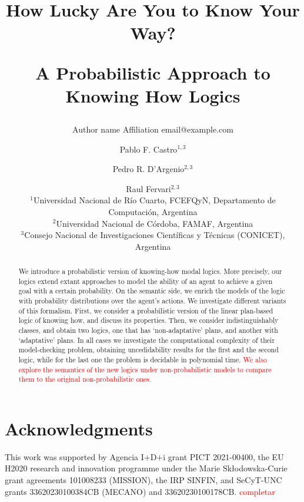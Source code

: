 \documentclass{article}
\title{How Lucky Are You to Know Your Way?\par A Probabilistic Approach to Knowing How Logics}   %
\author{%
    Author name
    \affiliations
    Affiliation
    \emails
    email@example.com    %
}
\author{%
Pablo F. Castro$^{1,3}$\and
Pedro R. D'Argenio$^{2,3}$\and
Raul Fervari$^{2,3}$ \\
\affiliations
$^1$Universidad Nacional de R\'io Cuarto, FCEFQyN, Departamento de Computaci\'on, Argentina\\
$^2$Universidad Nacional de C\'ordoba, FAMAF, Argentina\\
$^3$Consejo Nacional de Investigaciones Cient\'ificas y T\'ecnicas (CONICET), Argentina\\
}
\begin{document}
\maketitle

\begin{abstract}
  We introduce a probabilistic version of knowing-how modal logics.  More precisely,  our logics extend extant approaches to model the ability of an agent to achieve a given goal with a certain probability.  On the semantic side,  we enrich the models of the logic with probability distributions over the agent's actions.  We investigate different variants of this formalism.  First,  we consider a probabilistic version of the linear plan-based logic of knowing how, and discuss its properties. Then, we consider indistinguishably classes,  and obtain two logics,  one that has `non-adaptative' plans, and another  with `adaptative' plans. In all cases we investigate the computational complexity of their model-checking problem, obtaining uncedidability results for the first and the second logic, while for the last one the problem is decidable in polynomial time.  \textcolor{red}{We also explore the semantics of the new logics under non-probabilistic models to compare them to the original non-probabilistic ones.}
\end{abstract}







\section*{Acknowledgments}

This work was supported by Agencia I$+$D$+$i grant PICT 2021-00400,
%
the EU H2020 research and innovation programme
under the Marie Sk{\l}odowska-Curie grant agreements 101008233
({\scriptsize MISSION}),
%
the IRP SINFIN, 
%
and SeCyT-UNC grants 33620230100384CB ({\scriptsize MECANO}) and 33620230100178CB.
%
\textcolor{red}{completar}










\newpage
\onecolumn
\appendix


\end{document}
